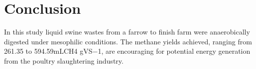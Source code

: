 \section{Conclusion}
In this study liquid swine wastes from a farrow to finish farm were anaerobically digested  under mesophilic conditions. The methane yields achieved, ranging from 261.35 to 594.59mLCH4 gVS−1, are encouraging for potential energy generation from the poultry slaughtering industry.